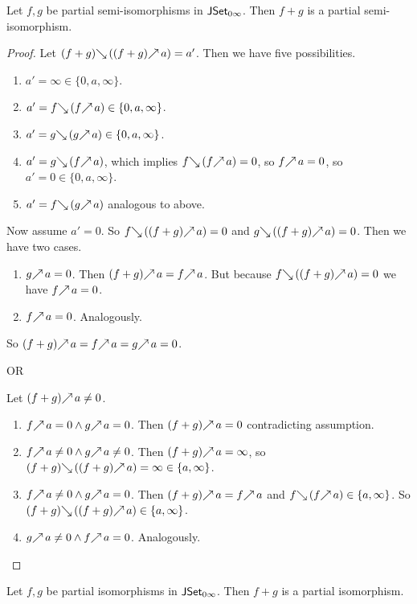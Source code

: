\documentclass[runningheads,envcountsame]{llncs}
\begin{document}
\begin{lemma}
    Let $f, g$ be partial semi-isomorphisms in $\mathsf{J}\mathsf{Set}_{0\infty}$. Then $f + g$ is a partial semi-isomorphism.
\end{lemma}
\begin{proof}
    Let $\b{(f + g)}\,(\f{(f + g)}\,a) = a'$. Then we have five possibilities. 
    \begin{enumerate}
        \item $a' = \infty \in \{ 0, a, \infty \}$.
        \item $a' = \b{f}\,(\f{f}\,a) \in \{ 0, a, \infty \}$.
        \item $a' = \b{g}\,(\f{g}\,a) \in \{ 0, a, \infty \}$.
        \item $a' = \b{g}\,(\f{f}\,a)$, which implies $\b{f}\,(\f{f}\,a) = 0$, so $\f{f}\,a = 0$, so $a' = 0 \in \{ 0, a, \infty \}$.
         \item $a' = \b{f}\,(\f{g}\,a)$ analogous to above.
    \end{enumerate}
    
    Now assume $a' = 0$. So $\b{f}\,(\f{(f + g)}\,a) = 0$ and $\b{g}\,(\f{(f + g)}\,a) = 0$. Then we have two cases.
    \begin{enumerate}
        \item $\f{g}\,a = 0$. Then $\f{(f + g)}\,a = \f{f}\,a$. But because $\b{f}\,(\f{(f + g)}\,a) = 0$ we have $\f{f}\,a = 0$.
        \item $\f{f}\,a = 0$. Analogously.
    \end{enumerate}
    So $\f{(f + g)}\,a = \f{f}\,a = \f{g}\,a = 0$.
    
    OR
    
    Let $\f{(f + g)}\,a \neq 0$.
    \begin{enumerate}
        \item $\f{f}\,a = 0 \wedge \f{g}\,a = 0$. Then $\f{(f + g)}\,a = 0$ contradicting assumption.
        \item $\f{f}\,a \neq 0 \wedge \f{g}\,a \neq 0$. Then $\f{(f + g)}\,a = \infty$, so $\b{(f + g)}\,(\f{(f + g)}\,a) = \infty \in \{a, \infty \}$. 
        \item $\f{f}\,a \neq 0 \wedge \f{g}\,a = 0$. Then $\f{(f + g)}\,a = \f{f}\,a$ and $\b{f}\,(\f{f}\,a) \in \{a, \infty\}$. So $\b{(f + g)}\,(\f{(f + g)}\,a) \in \{a, \infty \}$.
        \item $\f{g}\,a \neq 0 \wedge \f{f}\,a = 0$. Analogously.
    \end{enumerate}
\end{proof}
\begin{corollary}
    Let $f, g$ be partial isomorphisms in $\mathsf{J}\mathsf{Set}_{0\infty}$. Then $f + g$ is a partial isomorphism.
\end{corollary}
\end{document}
